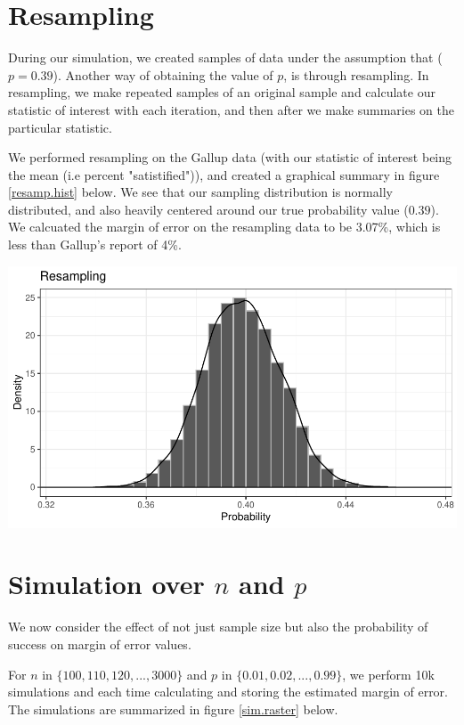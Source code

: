 \documentclass{article}\usepackage[]{graphicx}\usepackage[]{xcolor}
\newenvironment{Figure}
  {\par\medskip\noindent\minipage{\linewidth}}
  {\endminipage\par\medskip}
\begin{document}
\begin{multicols}{2}
\section{Resampling}
During our simulation, we created samples of data under the assumption that ($p = 0.39$). Another way of obtaining the value of $p$, is through resampling. In resampling, we make repeated samples of an original sample and calculate our statistic of interest with each iteration, and then after we make summaries on the particular statistic. 

We performed resampling on the Gallup data (with our statistic of interest being the mean (i.e percent "satistified")), and created a graphical summary in figure \ref{resamp.hist} below. We see that our sampling distribution is normally distributed, and also heavily centered around our true probability value ($0.39$). We calcuated the margin of error on the resampling data to be 3.07\%, which is less than Gallup's report of 4\%.

\begin{Figure}
\begin{centering}
\includegraphics[width=1\columnwidth]{plots/Rplot3.pdf}
\end{centering}
 \label{resamp.hist}
\end{Figure}

\section{Simulation over $n$ and $p$}
We now consider the effect of not just sample size but also the probability of success on margin of error values.  

For $n$ in $\{100, 110, 120, ... ,3000\}$ and $p$ in $\{0.01, 0.02, ..., 0.99\}$, we perform 10k simulations and each time calculating and storing the estimated margin of error. The simulations are summarized in figure \ref{sim.raster} below.


\end{multicols}
\end{document}
